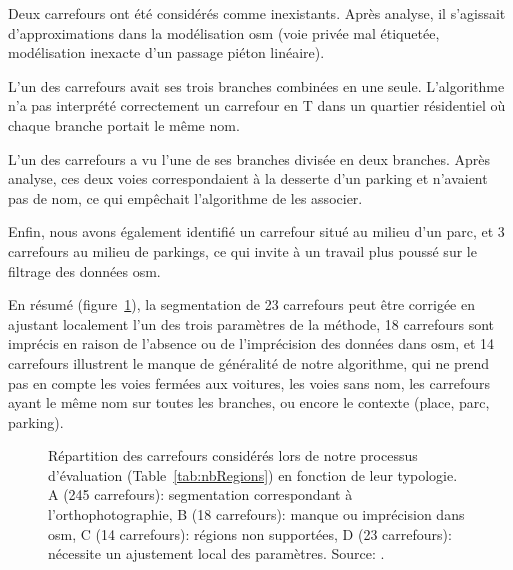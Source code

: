 \newpar{}

Deux carrefours ont été considérés comme inexistants. Après analyse, il s'agissait d'approximations dans la modélisation \gls{osm} (voie privée mal étiquetée, modélisation inexacte d'un passage piéton linéaire).

\newpar{}

L’un des carrefours avait ses trois branches combinées en une seule. L'algorithme n'a pas interprété correctement un carrefour en T dans un quartier résidentiel où chaque branche portait le même nom.

\newpar{}

L’un des carrefours a vu l’une de ses branches divisée en deux branches. Après analyse, ces deux voies correspondaient à la desserte d'un parking et n'avaient pas de nom, ce qui empêchait l'algorithme de les associer.

\newpar{}

Enfin, nous avons également identifié un carrefour situé au milieu d'un parc, et 3 carrefours au milieu de parkings, ce qui invite à un travail plus poussé sur le filtrage des données \gls{osm}.

\newpar{}

En résumé (figure~\ref{fig:camembert}), la segmentation de 23 carrefours peut être corrigée en ajustant localement l'un des trois paramètres de la méthode, 18 carrefours sont imprécis en raison de l'absence ou de l'imprécision des données dans \gls{osm}, et 14 carrefours illustrent le manque de généralité de notre algorithme, qui ne prend pas en compte les voies fermées aux voitures, les voies sans nom, les carrefours ayant le même nom sur toutes les branches, ou encore le contexte (place, parc, parking).

\begin{figure}[ht]
    \centering
    \footnotesize
    \caption[Répartition des carrefours considérés lors du processus d'évaluation]{Répartition des carrefours considérés lors de notre processus d'évaluation (Table~\ref{tab:nbRegions}) en fonction de leur typologie. A (245 carrefours): segmentation correspondant à l'orthophotographie, B (18 carrefours): manque ou imprécision dans \gls{osm}, C (14 carrefours): régions non supportées, D (23 carrefours): nécessite un ajustement local des paramètres. Source: \citep{Favreau2022}.}
    \label{fig:camembert}
\end{figure}

